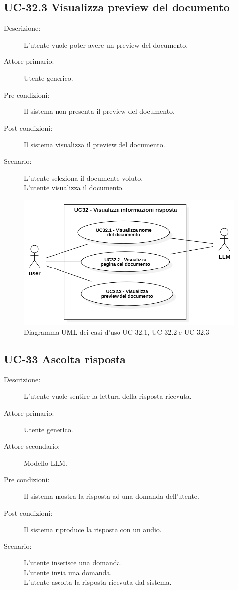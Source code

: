 \subsection{UC-32.3 Visualizza preview del documento}
\begin{description}
    \item[Descrizione:] L'utente vuole poter avere un preview del documento.
    \item[Attore primario:] Utente generico.
    \item[Pre condizioni:] Il sistema non presenta il preview del documento.
    \item[Post condizioni:] Il sistema visualizza il preview del documento.
    \item[Scenario:] L'utente seleziona il documento voluto. \\L'utente visualizza il documento.
\end{description}

\begin{figure}[H]
    \centering
    \includegraphics[width=0.9\linewidth]{UC32.1-2-3.PNG}
    \caption{Diagramma UML dei casi d'uso UC-32.1, UC-32.2 e UC-32.3}
    \label{fig:UC32.1-2-3}
\end{figure}

\subsection{UC-33 Ascolta risposta}
\begin{description}
    \item[Descrizione:] L'utente vuole sentire la lettura della risposta ricevuta.
    \item[Attore primario:] Utente generico.
    \item[Attore secondario:] Modello LLM.
    \item[Pre condizioni:] Il sistema mostra la risposta ad una domanda dell'utente.
    \item[Post condizioni:] Il sistema riproduce la risposta con un audio.
    \item[Scenario:] L'utente inserisce una domanda.\\L'utente invia una domanda.\\L'utente ascolta la risposta ricevuta dal sistema.
\end{description}

